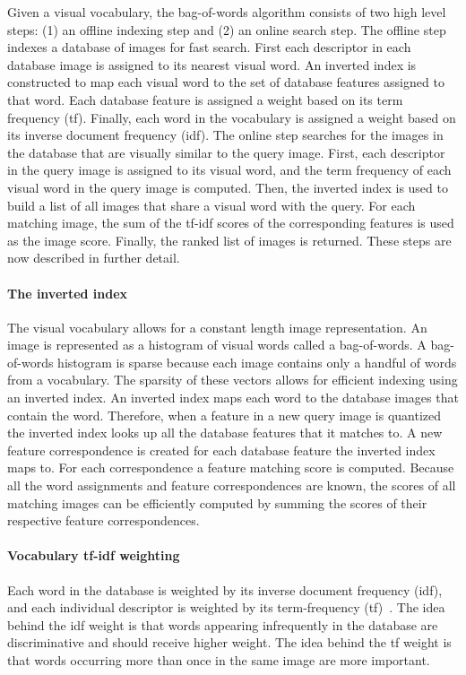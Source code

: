        Given a visual vocabulary, the bag-of-words algorithm consists of two high level steps: (1) an offline
        indexing step and (2) an online search step. The offline step indexes a database of images for fast search.
        First each descriptor in each database image is assigned to its nearest visual word. An inverted index is
        constructed to map each visual word to the set of database features assigned to that word. Each database
        feature is assigned a weight based on its term frequency (tf). Finally, each word in the vocabulary is
        assigned a weight based on its inverse document frequency (idf). The online step searches for the images in
        the database that are visually similar to the query image. First, each descriptor in the query image is
        assigned to its visual word, and the term frequency of each visual word in the query image is computed.
        Then, the inverted index is used to build a list of all images that share a visual word with the query. For
        each matching image, the sum of the tf-idf scores of the corresponding features is used as the image score.
        Finally, the ranked list of images is returned. These steps are now described in further detail.

        \paragraph{The inverted index}
            The visual vocabulary allows for a constant length image representation. An image is represented as a
            histogram of visual words called a bag-of-words. A bag-of-words histogram is sparse because each image
            contains only a handful of words from a vocabulary. The sparsity of these vectors allows for efficient
            indexing using an inverted index. An inverted index maps each word to the database images that contain
            the word. Therefore, when a feature in a new query image is quantized the inverted index looks up all
            the database features that it matches to. A new feature correspondence is created for each database
            feature the inverted index maps to. For each correspondence a feature matching score is computed.
            Because all the word assignments and feature correspondences are known, the scores of all matching
            images can be efficiently computed by summing the scores of their respective feature correspondences.

        \paragraph{Vocabulary tf-idf weighting}
            Each word in the database is weighted by its inverse document frequency (idf), and each individual
            descriptor is weighted by its term-frequency (tf)~\cite{sivic_efficient_2009}. The idea behind the idf
            weight is that words appearing infrequently in the database are discriminative and should receive
            higher weight. The idea behind the tf weight is that words occurring more than once in the same image
            are more important.

